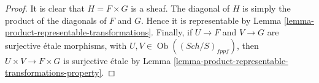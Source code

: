\documentclass[10pt,a4paper]{amsart}
\theoremstyle{plain}
\theoremstyle{definition}
\theoremstyle{remark}
\numberwithin{equation}{subsection}
\def\Sch{\mathit{Sch}}
\def\Ob{\mathop{\mathrm{Ob}}\nolimits}
\begin{document}
\begin{proof}
It is clear that $H = F \times G$ is a sheaf.
The diagonal of $H$ is simply the product of the
diagonals of $F$ and $G$. Hence it is representable by
Lemma \ref{lemma-product-representable-transformations}.
Finally, if $U \to F$ and $V \to G$ are surjective
\'etale morphisms, with $U, V \in \Ob((\Sch/S)_{fppf})$,
then $U \times V \to F \times G$ is surjective \'etale
by Lemma \ref{lemma-product-representable-transformations-property}.
\end{proof}
\end{document}
